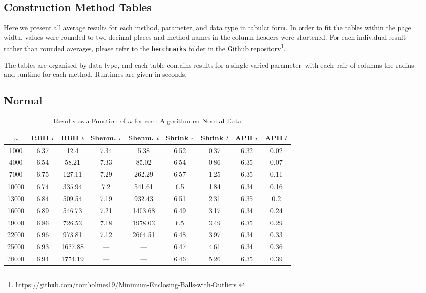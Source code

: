 \documentclass[11pt,twoside]{report}
\theoremstyle{definition}
\numberwithin{theorem}{section}
\numberwithin{definition}{section}
\numberwithin{lemma}{section}
\numberwithin{proposition}{section}
\numberwithin{equation}{section}
\numberwithin{figure}{section}
\begin{document}
\begin{appendices}
    \section{Construction Method Tables}\label{app:constr_tables}
    Here we present all average results for each method, parameter, and data type in tabular form. In order to fit the tables within the page width, values were rounded to two decimal places and method names in the column headers were shortened. For each individual result rather than rounded averages, please refer to the \texttt{benchmarks} folder in the Github repository\footnote{\url{https://github.com/tomholmes19/Minimum-Enclosing-Balls-with-Outliers} \cite{Holmes_Minimum_Enclosing_Balls_2021}}.
    
    The tables are organised by data type, and each table contains results for a single varied parameter, with each pair of columns the radius and runtime for each method. Runtimes are given in seconds.
    
    \subsection{Normal}
    \begin{table}[ht]
        \centering
        \begin{tabular}{|c||c|c||c|c||c|c||c|c|}\hline
            $n$&RBH $r$&RBH $t$&Shenm. $r$&Shenm. $t$&Shrink $r$&Shrink $t$&APH $r$&APH $t$ \\ \hline
            1000&6.37&12.4&7.34&5.38&6.52&0.37&6.32&0.02 \\
            4000&6.54&58.21&7.33&85.02&6.54&0.86&6.35&0.07 \\
            7000&6.75&127.11&7.29&262.29&6.57&1.25&6.35&0.11 \\
            10000&6.74&335.94&7.2&541.61&6.5&1.84&6.34&0.16 \\
            13000&6.84&509.54&7.19&932.43&6.51&2.31&6.35&0.2 \\
            16000&6.89&546.73&7.21&1403.68&6.49&3.17&6.34&0.24 \\
            19000&6.86&726.53&7.18&1978.03&6.5&3.49&6.35&0.29 \\
            22000&6.96&973.81&7.12&2664.51&6.48&3.97&6.34&0.33 \\
            25000&6.93&1637.88&---&---&6.47&4.61&6.34&0.36 \\
            28000&6.94&1774.19&---&---&6.46&5.26&6.35&0.39 \\ \hline
        \end{tabular}
        \caption{Results as a Function of $n$ for each Algorithm on Normal Data}
        \label{tab:normal_table_n}
    \end{table}
    

\end{appendices}
\end{document}
